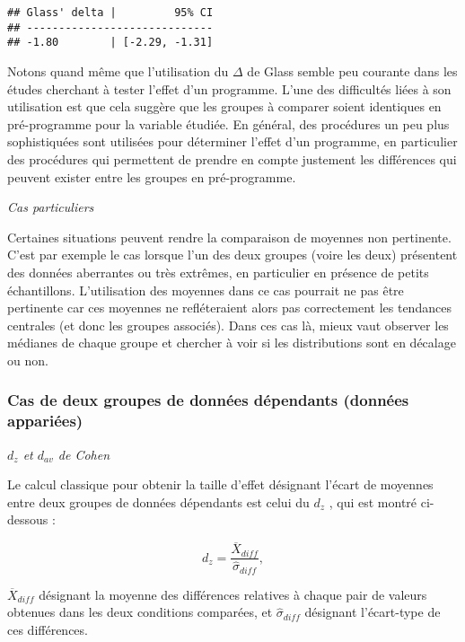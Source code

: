 \documentclass[
]{book}
\begin{document}
\begin{verbatim}
## Glass' delta |         95% CI
## -----------------------------
## -1.80        | [-2.29, -1.31]
\end{verbatim}

Notons quand même que l'utilisation du \(\Delta\) de Glass semble peu courante dans les études cherchant à tester l'effet d'un programme. L'une des difficultés liées à son utilisation est que cela suggère que les groupes à comparer soient identiques en pré-programme pour la variable étudiée. En général, des procédures un peu plus sophistiquées sont utilisées pour déterminer l'effet d'un programme, en particulier des procédures qui permettent de prendre en compte justement les différences qui peuvent exister entre les groupes en pré-programme.

\emph{Cas particuliers}

Certaines situations peuvent rendre la comparaison de moyennes non pertinente. C'est par exemple le cas lorsque l'un des deux groupes (voire les deux) présentent des données aberrantes ou très extrêmes, en particulier en présence de petits échantillons. L'utilisation des moyennes dans ce cas pourrait ne pas être pertinente car ces moyennes ne refléteraient alors pas correctement les tendances centrales (et donc les groupes associés). Dans ces cas là, mieux vaut observer les médianes de chaque groupe et chercher à voir si les distributions sont en décalage ou non.

\hypertarget{cas-de-deux-groupes-de-donnuxe9es-duxe9pendants-donnuxe9es-appariuxe9es}{%
\subsubsection{Cas de deux groupes de données dépendants (données appariées)}\label{cas-de-deux-groupes-de-donnuxe9es-duxe9pendants-donnuxe9es-appariuxe9es}}

\emph{\(d_{z}\) et \(d_{av}\) de Cohen}

Le calcul classique pour obtenir la taille d'effet désignant l'écart de moyennes entre deux groupes de données dépendants est celui du \(d_{z}\) \autocite{lakensCalculatingReportingEffect2013}, qui est montré ci-dessous :

\[d_{z} = \frac{\overline{X} _{diff}}{\hat{\sigma}_{diff}},\]

\(\overline{X}_{diff}\) désignant la moyenne des différences relatives à chaque pair de valeurs obtenues dans les deux conditions comparées, et \(\hat{\sigma}_{diff}\) désignant l'écart-type de ces différences.
\end{document}
